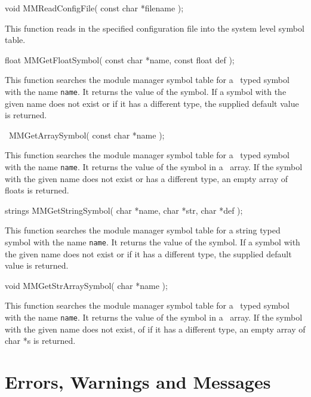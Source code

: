 \begin{prototype}
void MMReadConfigFile( const char *filename );
\end{prototype}

This function reads in the specified configuration file into the system
level symbol table.

\begin{prototype}
float MMGetFloatSymbol( const char *name, const float def );
\end{prototype}

This function searches the module manager symbol table for a \float\ typed
symbol with the name {\tt *name}. It returns the value of the symbol. If a
symbol with the given name does not exist or if it has a different type, the
supplied default value is returned.

\begin{prototype}
\floats\ MMGetArraySymbol( const char *name );
\end{prototype}

This function searches the module manager symbol table for a \floats\ typed
symbol with the name {\tt *name}. It returns the value of the symbol in a
\floats\ array. If the symbol with the given name does not exist or has a
different type, an empty array of floats is returned.

\begin{prototype}
strings MMGetStringSymbol( char *name, char *str, char *def );
\end{prototype}

This function searches the module manager symbol table for a string typed
symbol with the name {\tt *name}. It returns the value of the symbol. If a
symbol with the given name does not exist or if it has a different type, the
supplied default value is returned.

\begin{prototype}
void MMGetStrArraySymbol( char *name );
\end{prototype}

This function searches the module manager symbol table for a \strings\ 
typed symbol with the name {\tt *name}. It returns the value of the
symbol in a \strings\ array. If the symbol with the given name does
not exist, of if it has a different type, an empty array of char *s
is returned.

\section{Errors, Warnings and Messages} 

